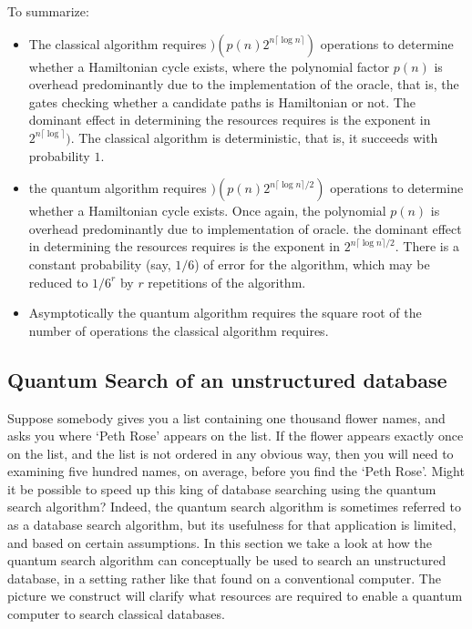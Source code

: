 To summarize:
\begin{itemize}
    \item The classical algorithm requires $)(p(n)2^{n\lceil \log n\rceil})$ operations to determine whether a Hamiltonian cycle exists, where the polynomial factor $p(n)$ is overhead predominantly due to the implementation of the oracle, that is, the gates checking whether a candidate paths is Hamiltonian or not. The dominant effect in determining the resources requires is the exponent in $2^{n\lceil \log \rceil})$. The classical algorithm is deterministic, that is, it succeeds with probability $1$.
    \item the quantum algorithm requires $)(p(n)2^{n\lceil \log n\rceil/2})$ operations to determine whether a Hamiltonian cycle exists. Once again, the polynomial $p(n)$ is overhead predominantly due to implementation of oracle. the dominant effect in determining the resources requires is the exponent in $2^{n\lceil \log n\rceil/2}$. There is a constant probability (say, $1/6$) of error for the algorithm, which may be reduced to $1/6^r$ by $r$ repetitions of the algorithm.
    \item Asymptotically the quantum algorithm requires the square root of the number of operations the classical algorithm requires.
\end{itemize}








\subsection{Quantum Search of an unstructured database}
Suppose somebody gives you a list containing one thousand flower names, and asks you where `Peth Rose' appears on the list. If the flower appears exactly once on the list, and the list is not ordered in any obvious way, then you will need to examining five hundred names, on average, before you find the `Peth Rose'. Might it be possible to speed up this king of database searching using the quantum search algorithm? Indeed, the quantum search algorithm is sometimes referred to as a database search algorithm, but its usefulness for that application is limited, and based on certain assumptions. In this section we take a look at how the quantum search algorithm can conceptually be used to search an unstructured database, in a setting rather like that found on a conventional computer. The picture we construct will clarify what resources are required to enable a quantum computer to search classical databases.

